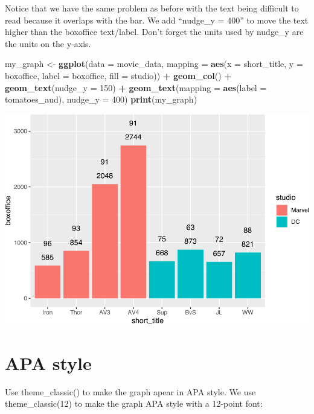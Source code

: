 \documentclass[
]{krantz}
\makeatletter
\newenvironment{Shaded}{\begin{snugshade}}{\end{snugshade}}
\newcommand{\DataTypeTok}[1]{\textcolor[rgb]{0.27,0.27,0.27}{#1}}
\newcommand{\DecValTok}[1]{\textcolor[rgb]{0.06,0.06,0.06}{#1}}
\newcommand{\KeywordTok}[1]{\textcolor[rgb]{0.27,0.27,0.27}{\textbf{#1}}}
\newcommand{\NormalTok}[1]{#1}
\newcommand{\OperatorTok}[1]{\textcolor[rgb]{0.43,0.43,0.43}{\textbf{#1}}}
\newcommand{\StringTok}[1]{\textcolor[rgb]{0.5,0.5,0.5}{#1}}
\newenvironment{kframe}{%
\medskip{}
\setlength{\fboxsep}{.8em}
 \def\at@end@of@kframe{}%
 \ifinner\ifhmode%
  \def\at@end@of@kframe{\end{minipage}}%
  \begin{minipage}{\columnwidth}%
 \fi\fi%
 \def\FrameCommand##1{\hskip\@totalleftmargin \hskip-\fboxsep
 \colorbox{shadecolor}{##1}\hskip-\fboxsep
     \hskip-\linewidth \hskip-\@totalleftmargin \hskip\columnwidth}%
 \MakeFramed {\advance\hsize-\width
   \@totalleftmargin\z@ \linewidth\hsize
   \@setminipage}}%
 {\par\unskip\endMakeFramed%
 \at@end@of@kframe}
\renewenvironment{Shaded}{\begin{kframe}}{\end{kframe}}
\makeatother
\begin{document}
Notice that we have the same problem as before with the text being difficult to read because it overlaps with the bar. We add ``nudge\_y = 400'' to move the text higher than the boxoffice text/label. Don't forget the units used by nudge\_y are the units on the y-axis.

\begin{Shaded}
\begin{Highlighting}[]
\NormalTok{my_graph <-}\StringTok{ }\KeywordTok{ggplot}\NormalTok{(}\DataTypeTok{data =}\NormalTok{ movie_data,}
           \DataTypeTok{mapping =} \KeywordTok{aes}\NormalTok{(}\DataTypeTok{x =}\NormalTok{ short_title,}
                         \DataTypeTok{y =}\NormalTok{ boxoffice,}
                         \DataTypeTok{label =}\NormalTok{ boxoffice, }
                         \DataTypeTok{fill =}\NormalTok{ studio)) }\OperatorTok{+}
\StringTok{  }\KeywordTok{geom_col}\NormalTok{() }\OperatorTok{+}
\StringTok{  }\KeywordTok{geom_text}\NormalTok{(}\DataTypeTok{nudge_y =} \DecValTok{150}\NormalTok{)  }\OperatorTok{+}
\StringTok{  }\KeywordTok{geom_text}\NormalTok{(}\DataTypeTok{mapping =} \KeywordTok{aes}\NormalTok{(}\DataTypeTok{label =}\NormalTok{ tomatoes_aud), }
            \DataTypeTok{nudge_y =} \DecValTok{400}\NormalTok{) }
\KeywordTok{print}\NormalTok{(my_graph)}
\end{Highlighting}
\end{Shaded}

\includegraphics[width=0.65\linewidth]{bookdown_files/figure-latex/unnamed-chunk-267-1}

\newpage

\hypertarget{apa-style}{%
\section{APA style}\label{apa-style}}

Use theme\_classic() to make the graph apear in APA style. We use theme\_classic(12) to make the graph APA style with a 12-point font:
\end{document}
